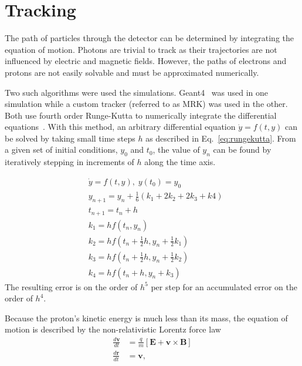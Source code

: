 \documentclass[oneside,12pt]{memoir}
\begin{document}
\section{Tracking}
\label{sec:mctrack}
The path of particles through the detector can be determined by integrating the equation of motion. Photons are trivial to track as their trajectories are not influenced by electric and magnetic fields. However, the paths of electrons and protons are not easily solvable and must be approximated numerically.\par
Two such algorithms were used the simulations. Geant4~\cite{geant4-nima} was used in one simulation while a custom tracker (referred to as MRK) was used in the other. Both use fourth order Runge-Kutta to numerically integrate the differential equations~\cite{press07}. With this method, an arbitrary differential equation $\dot{y}=f\left(t,y\right)$ can be solved by taking small time steps $h$ as described in Eq.~\ref{eq:rungekutta}. From a given set of initial conditions, $y_0$ and $t_0$, the value of $y_n$ can be found by iteratively stepping in increments of $h$ along the time axis.\par
\begin{subequations}
\label{eq:rungekutta}
\begin{align}
	&\dot{y}=f\left(t,y\right),\;y\left(t_0\right)=y_0\\
	&y_{n+1}=y_n+\frac{1}{6}\left(k_1+2k_2+2k_3+k4\right)\\
	&t_{n+1}=t_n+h\\
	&k_1=hf\left(t_n,y_n\right)\\
	&k_2=hf\left(t_n+\frac{1}{2}h,y_n+\frac{1}{2}k_1\right)\\
	&k_3=hf\left(t_n+\frac{1}{2}h,y_n+\frac{1}{2}k_2\right)\\
	&k_4=hf\left(t_n+h,y_n+k_3\right)
\end{align}
\end{subequations}
The resulting error is on the order of $h^5$ per step for an accumulated error on the order of $h^4$.\par
Because the proton's kinetic energy is much less than its mass, the equation of motion is described by the non-relativistic Lorentz force law
\begin{subequations}
\label{eq:nrlorentz}
\begin{align}
	\frac{d\mathbf{v}}{dt} &=\frac{q}{m}\left[
		\mathbf{E}+\mathbf{v}\times\mathbf{B}\right]\\
	\frac{d\mathbf{r}}{dt} &=\mathbf{v},
\end{align}
\end{subequations}
\end{document}
